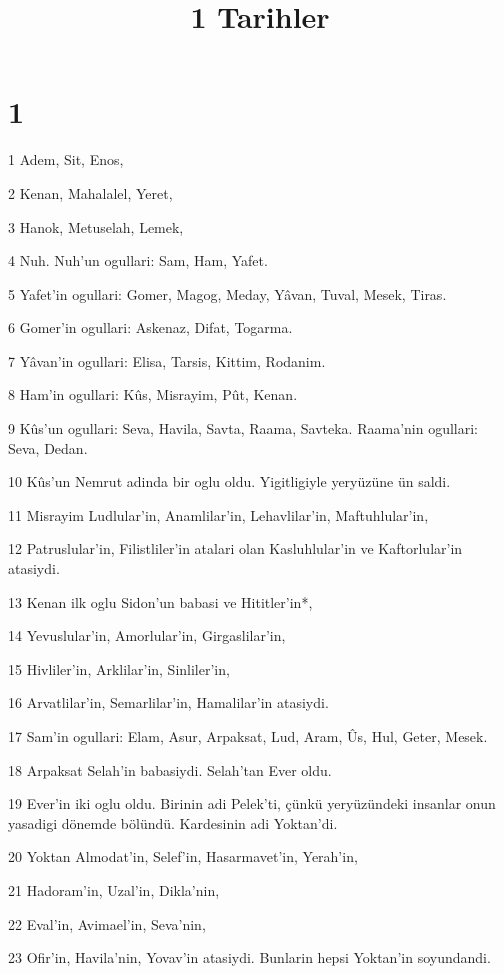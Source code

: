 

\title{1 Tarihler}

\chapter{1}

\par 1 Adem, Sit, Enos,
\par 2 Kenan, Mahalalel, Yeret,
\par 3 Hanok, Metuselah, Lemek,
\par 4 Nuh. Nuh'un ogullari: Sam, Ham, Yafet.
\par 5 Yafet'in ogullari: Gomer, Magog, Meday, Yâvan, Tuval, Mesek, Tiras.
\par 6 Gomer'in ogullari: Askenaz, Difat, Togarma.
\par 7 Yâvan'in ogullari: Elisa, Tarsis, Kittim, Rodanim.
\par 8 Ham'in ogullari: Kûs, Misrayim, Pût, Kenan.
\par 9 Kûs'un ogullari: Seva, Havila, Savta, Raama, Savteka. Raama'nin ogullari: Seva, Dedan.
\par 10 Kûs'un Nemrut adinda bir oglu oldu. Yigitligiyle yeryüzüne ün saldi.
\par 11 Misrayim Ludlular'in, Anamlilar'in, Lehavlilar'in, Maftuhlular'in, 
\par 12 Patruslular'in, Filistliler'in atalari olan Kasluhlular'in ve Kaftorlular'in atasiydi.
\par 13 Kenan ilk oglu Sidon'un babasi ve Hititler'in*, 
\par 14 Yevuslular'in, Amorlular'in, Girgaslilar'in, 
\par 15 Hivliler'in, Arklilar'in, Sinliler'in, 
\par 16 Arvatlilar'in, Semarlilar'in, Hamalilar'in atasiydi.
\par 17 Sam'in ogullari: Elam, Asur, Arpaksat, Lud, Aram, Ûs, Hul, Geter, Mesek.
\par 18 Arpaksat Selah'in babasiydi. Selah'tan Ever oldu.
\par 19 Ever'in iki oglu oldu. Birinin adi Pelek'ti, çünkü yeryüzündeki insanlar onun yasadigi dönemde bölündü. Kardesinin adi Yoktan'di.
\par 20 Yoktan Almodat'in, Selef'in, Hasarmavet'in, Yerah'in, 
\par 21 Hadoram'in, Uzal'in, Dikla'nin, 
\par 22 Eval'in, Avimael'in, Seva'nin, 
\par 23 Ofir'in, Havila'nin, Yovav'in atasiydi. Bunlarin hepsi Yoktan'in soyundandi.
